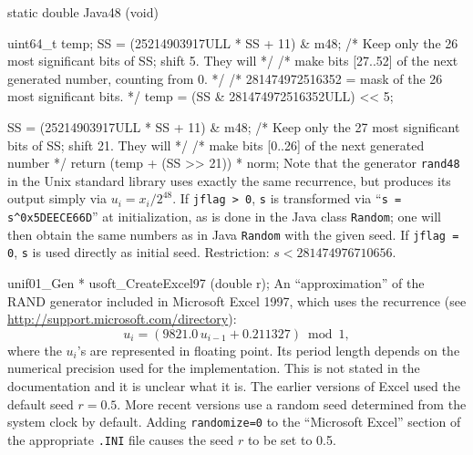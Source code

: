 static double Java48 (void) {
   uint64_t temp;
   SS = (25214903917ULL * SS + 11) \& m48;
   /* Keep only the 26 most significant bits of SS; shift 5.  They will */
   /* make bits [27..52] of the next generated number, counting from 0. */
   /* 281474972516352 = mask of the 26 most significant bits. */
   temp = (SS \& 281474972516352ULL) << 5;

   SS = (25214903917ULL * SS + 11) \& m48;
   /* Keep only the 27 most significant bits of SS; shift 21. They will */
   /* make bits [0..26] of the next generated number */
   return (temp + (SS >> 21)) * norm;
\fi  %
 Note that the generator {\tt rand48} in the Unix standard library
 uses exactly the same recurrence, but produces its output simply
 via $u_i = x_i / 2^{48}$.
 If {\tt jflag > 0}, {\tt s} is transformed via
 ``{\tt s = s\^{}0x5DEECE66D}'' at initialization, as is done in the
 Java class {\tt Random}; one will then obtain the same numbers as
 in Java {\tt Random} with the given seed.
 If {\tt jflag = 0}, {\tt s} is used directly as initial seed.
 Restriction: $s < 281474976710656$.
  \endtab
\hide  %
\code

unif01_Gen * usoft_CreateExcel97 (double r);
\endcode
  \tab
  An ``approximation'' of the {RAND} generator included in
  Microsoft Excel 1997, which uses the recurrence
  (see \url{http://support.microsoft.com/directory}):
$$
   u_{i}  = (9821.0\, u_{i-1} + 0.211327) \bmod 1,
$$
  where the $u_i$'s are represented in floating point.
  Its period length depends on the numerical precision used for the
  implementation.  This is not stated in the documentation
  and it is unclear what it is.
  The earlier versions of  Excel used the default seed $r = 0.5$.
  More recent versions use a random seed determined from the
  system clock by default.
  Adding {\tt randomize=0} to the ``Microsoft Excel'' section of the
  appropriate {\tt .INI} file causes the seed $r$ to be set to 0.5.
  \endtab
\endhide  %
\code


}
